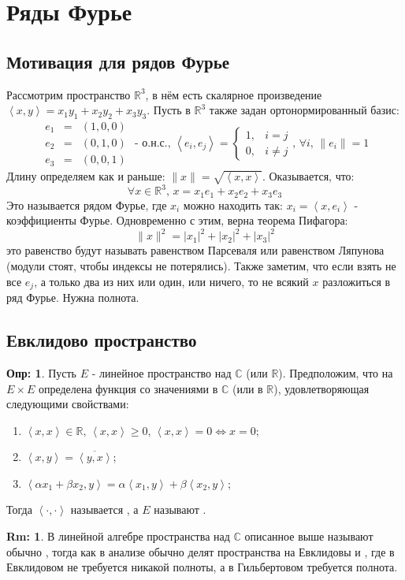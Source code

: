\documentclass[12pt]{article}
\newcommand{\RN}[1]{%
	\textup{\uppercase\expandafter{\romannumeral#1}}%
}
\newcommand{\MR}{\mathbb{R}}
\newcommand{\MC}{\mathbb{C}}
\theoremstyle{definition}
\newtheorem{defn}{Опр:}
\newtheorem{rem}{Rm:}
\newcommand{\inner}[2]{\left\langle #1, #2 \right\rangle }
\begin{document}
\lhead{Математический анализ - \RN{3}}
\section*{Ряды Фурье}
\subsection*{Мотивация для рядов Фурье}
Рассмотрим пространство $\MR^3$, в нём есть скалярное произведение $\inner{x}{y} = x_1 y_1 + x_2 y_2 + x_3 y_3$. Пусть в $\MR^3$ также задан ортонормированный базис:
$$
	\begin{array}{rcl}
		e_1 &=& (1,0,0)\\
		e_2 &=& (0,1,0) \\
		e_3 &=& (0,0,1)
	\end{array} \text{ - о.н.с.}, \, 
	\inner{e_i}{e_j} = 
	\left\{
		\begin{array}{rl}
			1, & i = j\\
			0, & i \neq j
		\end{array}
	\right., \, \forall i, \, \|e_i\| = 1
$$
Длину определяем как и раньше: $\|x\| = \sqrt{\inner{x}{x}}$. Оказывается, что:
$$
	\forall x \in \MR^3, \, x = x_1 e_1 + x_2 e_2 + x_3 e_3
$$
Это называется рядом Фурье, где $x_i$ можно находить так: $x_i = \inner{x}{e_i}$ - коэффициенты Фурье. Одновременно с этим, верна теорема Пифагора:
$$
	\|x\|^2 = |x_1|^2 + |x_2|^2 + |x_3|^2
$$
это равенство будут называть равенством Парсеваля или равенством Ляпунова (модули стоят, чтобы индексы не потерялись). Также заметим, что если взять не все $e_j$, а только два из них или один, или ничего, то не всякий $x$ разложиться в ряд Фурье. Нужна полнота.
\subsection*{Евклидово пространство}
\begin{defn}
	Пусть $E$ - линейное пространство над $\MC$ (или $\MR$). Предположим, что на $E\times E$ определена функция со значениями в $\MC$ (или в $\MR$), удовлетворяющая следующими свойствами:
	\begin{enumerate}[label=\arabic*)]
		\item $\inner{x}{x}\in\MR, \, \inner{x}{x} \geq 0, \, \inner{x}{x} = 0 \Leftrightarrow x = 0$;
		\item $\inner{x}{y} = \overline{\inner{y}{x}}$;
		\item $\inner{\alpha x_1 + \beta x_2}{y} =  \alpha \inner{x_1}{y} + \beta \inner{x_2}{y}$;
	\end{enumerate}
	Тогда $\inner{\cdot}{\cdot}$ называется , а $E$ называют .
\end{defn}
\begin{rem}
	В линейной алгебре пространства над $\MC$ описанное выше называют обычно , тогда как в анализе обычно делят пространства на Евклидовы и , где в Евклидовом не требуется никакой полноты, а в Гильбертовом требуется полнота.
\end{rem}
\end{document}
